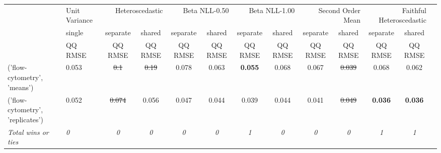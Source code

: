 \begin{tabular}{ll|c|cc|cc|cc|cc|cc}
\toprule
{} & {Unit Variance} & \multicolumn{2}{r}{Heteroscedastic} & \multicolumn{2}{r}{Beta NLL-0.50} & \multicolumn{2}{r}{Beta NLL-1.00} & \multicolumn{2}{r}{Second Order Mean} & \multicolumn{2}{r}{Faithful Heteroscedastic} \\
{} & {single} & {separate} & {shared} & {separate} & {shared} & {separate} & {shared} & {separate} & {shared} & {separate} & {shared} \\
{} & {QQ RMSE} & {QQ RMSE} & {QQ RMSE} & {QQ RMSE} & {QQ RMSE} & {QQ RMSE} & {QQ RMSE} & {QQ RMSE} & {QQ RMSE} & {QQ RMSE} & {QQ RMSE} \\
\midrule
('flow-cytometry', 'means') & 0.053 & \sout{0.1} & \sout{0.19} & 0.078 & 0.063 & \textbf{0.055} & 0.068 & 0.067 & \sout{0.039} & 0.068 & 0.062 \\
('flow-cytometry', 'replicates') & 0.052 & \sout{0.074} & 0.056 & 0.047 & 0.044 & 0.039 & 0.044 & 0.041 & \sout{0.049} & \textbf{0.036} & \textbf{0.036} \\
\textit{{Total wins or ties}} & \textit{0} & \textit{0} & \textit{0} & \textit{0} & \textit{0} & \textit{1} & \textit{0} & \textit{0} & \textit{0} & \textit{1} & \textit{1} \\
\bottomrule
\end{tabular}

